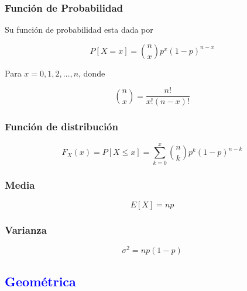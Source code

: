 \documentclass{article}
\begin{document}
\begin{multicols}{2}
                \subsubsection{Función de Probabilidad}

                    Su función de probabilidad esta dada por


                        \begin{equation*}
                            P[X=x]= \binom{n}{x} p^x (1-p)^{n-x}
                        \end{equation*}

                    Para $x=0,1,2,\ldots , n$, donde 

                        \begin{equation*}
                            \binom{n}{x} = \frac{n!}{x!(n-x)!}
                        \end{equation*}
                        
                \subsubsection{Función de distribución }

                        \begin{equation*}
                            F_X(x) = P[X\leq x]= \sum _{k=0}^x \binom{n}{k} p^k(1-p)^{n-k}     
                        \end{equation*}

                \subsubsection{Media}

                \begin{equation*}
                    E[X] = np
                \end{equation*}
                
                \subsubsection{Varianza}

                \begin{equation*}
                    \sigma ^2 = np(1-p)
                \end{equation*}
                        
        \subsection{\textcolor{blue}{Geométrica}}


\end{multicols}
\end{document}
